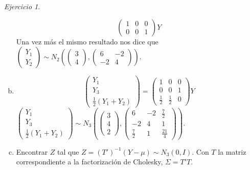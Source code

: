 \documentclass[12pt,spanish]{article}
\theoremstyle{definition}
\theoremstyle{remark}
\newtheorem{exercise}{Ejercicio}
\begin{document}
\begin{exercise}
\begin{enumerate}[a)]
\[\begin{pmatrix}
          1 & 0 & 0 \\
          0 & 0 & 1
        \end{pmatrix}Y\] Una vez más el mismo resultado nos dice
      que $\begin{pmatrix}
          Y_1 \\
          Y_2
        \end{pmatrix}\sim N_2\left(
        \begin{pmatrix}
          3 \\ 4
        \end{pmatrix},
        \begin{pmatrix}
          6 & -2 \\
          -2 & 4
        \end{pmatrix}\right)$.
      \item \[\begin{pmatrix}
          Y_1 \\
          Y_3 \\
          \frac{1}{2}(Y_1+Y_2)
        \end{pmatrix}
        =\begin{pmatrix}
          1 & 0 & 0 \\
          0 & 0 & 1 \\
          \frac{1}{2} & \frac{1}{2} & 0
        \end{pmatrix}Y\]
      $\begin{pmatrix}
         Y_1 \\
         Y_3 \\
         \frac{1}{2}(Y_1+Y_2)
        \end{pmatrix}\sim N_3\left(
        \begin{pmatrix}
          3 \\ 4 \\ 2
        \end{pmatrix},
        \begin{pmatrix}
          6 & -2 & \frac{7}{2} \\
          -2 & 4 & 1 \\
          \frac{7}{2} & 1 & \frac{21}{4}
        \end{pmatrix}\right)$.
    \item Encontrar $Z$ tal que $Z=(T')^{-1}(Y-\mu)\sim N_3(0,I)$. Con
      $T$ la matriz correspondiente a la factorización de Cholesky,
      $\Sigma=T'T$.


\end{enumerate}
\end{exercise}
\end{document}
